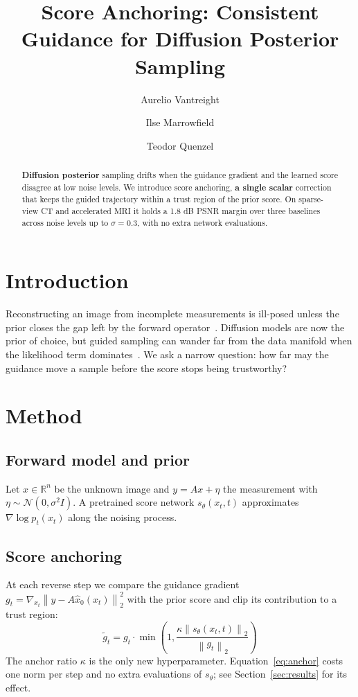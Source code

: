 \documentclass[journal]{IEEEtran}
\title{Score Anchoring: Consistent Guidance for Diffusion Posterior Sampling}
\author{Aurelio Vantreight \and Ilse Marrowfield \and Teodor Quenzel}
\newcommand{\norm}[1]{\left\lVert #1 \right\rVert}
\newcommand{\score}{s_\theta}
\begin{document}
\maketitle

\begin{abstract}
\textbf{Diffusion posterior} sampling drifts when the guidance gradient and the learned score disagree at low noise levels. We introduce score anchoring, \textbf{a single scalar} correction that keeps the guided trajectory within a trust region of the prior score. On sparse-view CT and accelerated MRI it holds a 1.8 dB PSNR margin over three baselines across noise levels up to $\sigma = 0.3$, with no extra network evaluations.
\end{abstract}

\section{Introduction}
Reconstructing an image from incomplete measurements is ill-posed unless the prior closes the gap left by the forward operator~\cite{okonkwo2021,lindqvist2022}. Diffusion models are now the prior of choice, but guided sampling can wander far from the data manifold when the likelihood term dominates~\cite{morales2023}. We ask a narrow question: how far may the guidance move a sample before the score stops being trustworthy?

\section{Method}
\subsection{Forward model and prior}
Let $x \in \mathbb{R}^n$ be the unknown image and $y = A x + \eta$ the measurement with $\eta \sim \mathcal{N}(0, \sigma^2 I)$. A pretrained score network $\score(x_t, t)$ approximates $\nabla \log p_t(x_t)$ along the noising process.

\subsection{Score anchoring}
At each reverse step we compare the guidance gradient $g_t = \nabla_{x_t} \norm{y - A \hat{x}_0(x_t)}_2^2$ with the prior score and clip its contribution to a trust region:
\begin{equation}
  \tilde{g}_t = g_t \cdot \min\!\left(1, \frac{\kappa \norm{\score(x_t, t)}_2}{\norm{g_t}_2}\right)
  \label{eq:anchor}
\end{equation}
The anchor ratio $\kappa$ is the only new hyperparameter. Equation~\eqref{eq:anchor} costs one norm per step and no extra evaluations of $\score$; see Section~\ref{sec:results} for its effect.
\end{document}
